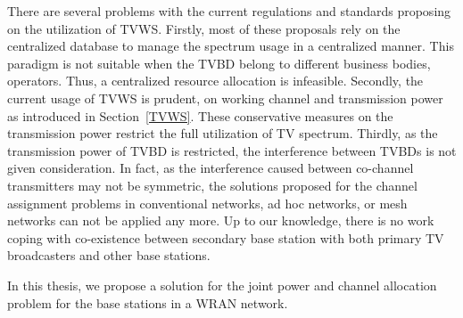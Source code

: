 There are several problems with the current regulations and standards proposing on the utilization of TVWS.
Firstly, most of these proposals rely on the centralized database to manage the spectrum usage in a centralized manner.
This paradigm is not suitable when the TVBD belong to different business bodies, \ie operators.
Thus, a centralized resource allocation is infeasible.
Secondly, the current usage of TVWS is prudent, \ie on working channel and transmission power as introduced in Section~\ref{TVWS}.
These conservative measures on the transmission power restrict the full utilization of TV spectrum.
Thirdly, as the transmission power of TVBD is restricted, the interference between TVBDs is not given consideration.
In fact, as the interference caused between co-channel transmitters may not be symmetric, the solutions proposed for the channel assignment problems in conventional networks, \eg ad hoc networks, or mesh networks can not be applied any more.
Up to our knowledge, there is no work coping with co-existence between secondary base station with both primary TV broadcasters and other base stations.



In this thesis, we propose a solution for the joint power and channel allocation problem for the base stations in a WRAN network.




